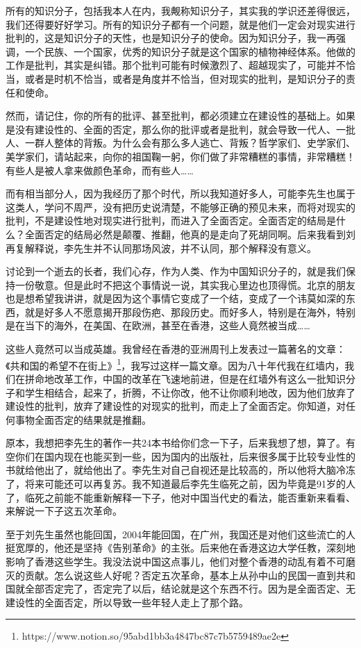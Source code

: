 \documentclass[UTF8, 12pt, a4paper]{ctexrep}
\begin{document}
所有的知识分子，包括我本人在内，我觍称知识分子，其实我的学识还差得很远，我们还得要好好学习。所有的知识分子都有一个问题，就是他们一定会对现实进行批判的，这是知识分子的天性，也是知识分子的使命。因为知识分子，我一再强调，一个民族、一个国家，优秀的知识分子就是这个国家的植物神经体系。他做的工作是批判，其实是纠错。那个批判可能有时候激烈了、超越现实了，可能并不恰当，或者是时机不恰当，或者是角度并不恰当，但对现实的批判，是知识分子的责任和使命。

然而，请记住，你的所有的批评、甚至批判，都必须建立在建设性的基础上。如果是没有建设性的、全面的否定，那么你的批评或者是批判，就会导致一代人、一批人、一群人整体的背叛。为什么会有那么多人逃亡、背叛？哲学家们、史学家们、美学家们，请站起来，向你的祖国鞠一躬，你们做了非常糟糕的事情，非常糟糕！有些人是被人拿来做颜色革命，而有些人……

而有相当部分人，因为我经历了那个时代，所以我知道好多人，可能李先生也属于这类人，学问不周严，没有把历史说清楚，不能够正确的预见未来，而将对现实的批判，不是建设性地对现实进行批判，而进入了全面否定。全面否定的结局是什么？全面否定的结局必然是颠覆、推翻，他真的是走向了死胡同啊。后来我看到刘再复解释说，李先生并不认同那场风波，并不认同，那个解释没有意义。

讨论到一个逝去的长者，我们心存，作为人类、作为中国知识分子的，就是我们保持一份敬意。但是此时不把这个事情说一说，其实我心里边也顶得慌。北京的朋友也是想希望我讲讲，就是因为这个事情它变成了一个结，变成了一个讳莫如深的东西，就是好多人不愿意揭开那段伤疤、那段历史。而好多人，特别是在海外，特别是在当下的海外，在美国、在欧洲，甚至在香港，这些人竟然被当成……

这些人竟然可以当成英雄。我曾经在香港的亚洲周刊上发表过一篇著名的文章：《共和国的希望不在街上》\footnote{https://www.notion.so/95abd1bb3a4847bc87c7b5759489ae2e}，我写过这样一篇文章。因为八十年代我在红墙内，我们在拼命地改革工作，中国的改革在飞速地前进，但是在红墙外有这么一批知识分子和学生相结合，起来了，折腾，不让你改，他不让你顺利地改，因为他们放弃了建设性的批判，放弃了建设性的对现实的批判，而走上了全面否定。你知道，对任何事物全面否定的结果就是推翻。

原本，我想把李先生的著作一共24本书给你们念一下子，后来我想了想，算了。有空你们在国内现在也能买到一些，因为国内的出版社，后来很多属于比较专业性的书就给他出了，就给他出了。李先生对自己自视还是比较高的，所以他将大脑冷冻了，将来可能还可以再复苏。我不知道最后李先生临死之前，因为毕竟是91岁的人了，临死之前能不能重新解释一下子，他对中国当代史的看法，能否重新来看看、来解说一下子这五次革命。

至于刘先生虽然也能回国，2004年能回国，在广州，我国还是对他们这些流亡的人挺宽厚的，他还是坚持《告别革命》的主张。后来他在香港这边大学任教，深刻地影响了香港这些学生。我没法说中国这点事儿，他们对整个香港的动乱有着不可磨灭的贡献。怎么说这些人好呢？否定五次革命，基本上从孙中山的民国一直到共和国就全部否定完了，否定完了以后，结论就是这个东西不行。因为是全面否定、无建设性的全面否定，所以导致一些年轻人走上了那个路。
\end{document}
